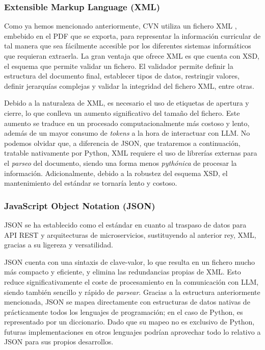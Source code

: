 \documentclass[12pt,a4paper]{article}
\begin{document}
\subsubsection{Extensible Markup Language (XML)}
Como ya hemos mencionado anteriormente, CVN utiliza un fichero XML \cite{w3c_xml}, embebido en el PDF que se exporta, para representar la información curricular de tal manera que sea fácilmente accesible por los diferentes sistemas informáticos que requieran extraerla. La gran ventaja que ofrece XML es que cuenta con XSD, el esquema que permite validar un fichero. El validador permite definir la estructura del documento final, establecer tipos de datos, restringir valores, definir jerarquías complejas y validar la integridad del fichero XML, entre otras.

Debido a la naturaleza de XML, es necesario el uso de etiquetas de apertura y cierre, lo que conlleva un aumento significativo del tamaño del fichero. Este aumento se traduce en un procesado computacionalmente más costoso y lento, además de un mayor consumo de \textit{tokens} a la hora de interactuar con LLM. No podemos olvidar que, a diferencia de JSON, que trataremos a continuación, tratable nativamente por Python, XML requiere el uso de librerías externas para el \textit{parseo} del documento, siendo una forma menos \textit{pythónica} de procesar la información. Adicionalmente, debido a la robustez del esquema XSD, el mantenimiento del estándar se tornaría lento y costoso.

\subsubsection{JavaScript Object Notation (JSON)}

JSON \cite{json_org_es} se ha establecido como el estándar en cuanto al traspaso de datos para API REST y arquitecturas de microservicios, sustituyendo al anterior rey, XML, gracias a su ligereza y versatilidad.

JSON cuenta con una sintaxis de clave-valor, lo que resulta en un fichero mucho más compacto y eficiente, y elimina las redundancias propias de XML. Esto reduce significativamente el coste de procesamiento en la comunicación con LLM, siendo también sencillo y rápido de \textit{parsear}. Gracias a la estructura anteriormente mencionada, JSON se mapea directamente con estructuras de datos nativas de prácticamente todos los lenguajes de programación; en el caso de Python, es representado por un diccionario. Dado que su mapeo no es exclusivo de Python, futuras implementaciones en otros lenguajes podrían aprovechar todo lo relativo a JSON para sus propios desarrollos.
\end{document}
